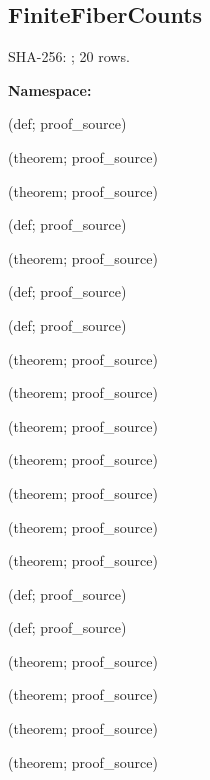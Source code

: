 \subsection*{FiniteFiberCounts}
{\footnotesize SHA-256: ; 20 rows.}\par
\begingroup\small
\textbf{Namespace:} \par
\noindent{} {\scriptsize (def; proof\_source)}\par
\noindent{} {\scriptsize (theorem; proof\_source)}\par
\noindent{} {\scriptsize (theorem; proof\_source)}\par
\noindent{} {\scriptsize (def; proof\_source)}\par
\noindent{} {\scriptsize (theorem; proof\_source)}\par
\noindent{} {\scriptsize (def; proof\_source)}\par
\noindent{} {\scriptsize (def; proof\_source)}\par
\noindent{} {\scriptsize (theorem; proof\_source)}\par
\noindent{} {\scriptsize (theorem; proof\_source)}\par
\noindent{} {\scriptsize (theorem; proof\_source)}\par
\noindent{} {\scriptsize (theorem; proof\_source)}\par
\noindent{} {\scriptsize (theorem; proof\_source)}\par
\noindent{} {\scriptsize (theorem; proof\_source)}\par
\noindent{} {\scriptsize (theorem; proof\_source)}\par
\noindent{} {\scriptsize (def; proof\_source)}\par
\noindent{} {\scriptsize (def; proof\_source)}\par
\noindent{} {\scriptsize (theorem; proof\_source)}\par
\noindent{} {\scriptsize (theorem; proof\_source)}\par
\noindent{} {\scriptsize (theorem; proof\_source)}\par
\noindent{} {\scriptsize (theorem; proof\_source)}\par
\endgroup
